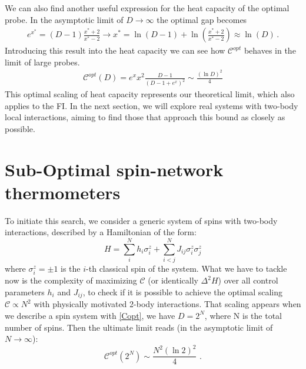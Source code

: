 We can also find another useful expression for the heat capacity of the optimal probe. In the asymptotic limit of $D\rightarrow\infty$ the optimal gap becomes
\begin{align}
  e^{x^*}=(D-1)\frac{x^*+2}{x^*-2} \rightarrow x^*=\ln(D-1) +\ln\left(\frac{x^*+2}{x^*-2}\right) \approx \ln(D) \,.
\end{align}
Introducing this result into the heat capacity we can see how $\mathcal{C}^{opt}$ behaves in the limit of large probes.
\begin{align}
    \mathcal{C}^{opt}(D) = e^xx^2\frac{D-1}{\left(D-1+e^{x}\right)^2} \sim \frac{(\ln D)^2}{4}
    \label{Copt}
\end{align}
This optimal scaling of heat capacity represents our theoretical limit, which also applies to the FI. In the next section, we will explore real systems with two-body local interactions, aiming to find those that approach this bound as closely as possible.


\section{Sub-Optimal spin-network thermometers}
To initiate this search, we consider a generic system of spins with two-body interactions, described by a Hamiltonian of the form:
\begin{equation}
    H = \sum_i^Nh_i\sigma_i^z + \sum_{i<j}^N J_{ij}\sigma_i^z\sigma_j^z
\end{equation}
where $\sigma_i^z = \pm 1$ is the $i$-th classical spin of the system. What we have to tackle now is the complexity of maximizing $\mathcal{C}$ (or identically $\Delta^2 H$) over all control parameters $h_i$ and $J_{ij}$, to check if it is possible to achieve the optimal scaling $\mathcal{C}\propto N^2$ with physically motivated 2-body interactions. That scaling appears when we describe a spin system with \eqref{Copt}, we have $D=2^N$, where N is the total number of spins. Then the ultimate limit reads (in the asymptotic limit of $N\to \infty$):
\begin{equation}\label{C_opt_spins}
    \mathcal{C}^{opt}(2^N)\sim \frac{N^2(\ln2)^2}{4} \,\, .
\end{equation}

